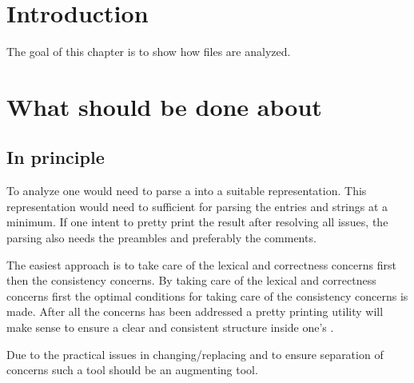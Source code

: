 

\section{Introduction}
The goal of this chapter is to show how {\bibtex} files are analyzed.


\section{What should be done about {\bibtex}}
\subsection{In principle}

To analyze {\bibtex} one would need to parse a  into a
suitable representation.  This representation would need to sufficient
for parsing the {\bibtex} entries and strings at a minimum.  If one
intent to pretty print the result after resolving all issues, the
parsing also needs the preambles and preferably the comments.

The easiest approach is to take care of the lexical and correctness
concerns first then the consistency concerns.  By taking care of the
lexical and correctness concerns first the optimal conditions for
taking care of the consistency concerns is made.  After all the
concerns has been addressed a pretty printing utility will make sense
to ensure a clear and consistent structure inside one's .

Due to the practical issues in changing/replacing {\bibtex} and to
ensure separation of concerns such a tool should be an augmenting
tool.

